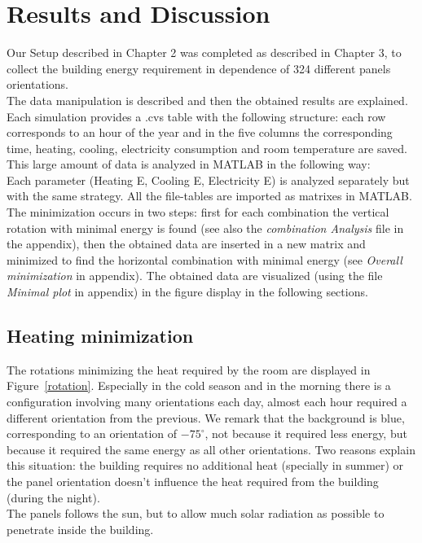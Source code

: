 \chapter{Results and Discussion}

Our Setup described in Chapter 2 was completed as described in Chapter 3, to collect the building energy requirement in dependence of 324 different panels orientations.\\
The data manipulation is described and then the obtained results are explained.\\
Each simulation provides a .cvs table with the following structure: each row corresponds to an hour of the year and in the five columns the corresponding time, heating, cooling, electricity consumption and room temperature are saved.
This large amount of data is analyzed in MATLAB in the following way:\\
Each parameter (Heating E, Cooling E, Electricity E) is analyzed separately but with the same strategy. All the file-tables are imported as matrixes in MATLAB. The minimization occurs in two steps: first for each combination the vertical rotation with minimal energy is found (see also the \textit{combination Analysis} file in the appendix), then the obtained data are inserted in a new matrix and minimized to find the horizontal combination with minimal energy (see \textit{Overall minimization} in appendix).
The obtained data are visualized (using the file \textit{Minimal plot} in appendix) in the figure display in the following sections.

\newpage

\section{Heating minimization}

The rotations minimizing the heat required by the room are displayed in Figure~\ref{rotation}. Especially in the cold season and in the morning there is a configuration involving many orientations each day, almost each hour required a different orientation from the previous. We remark that the background is blue, corresponding to an orientation of $-75 ^\circ$, not because it required less energy, but because it required the same energy as all other orientations. Two reasons explain this situation: the building requires no additional heat (specially in summer) or the panel orientation doesn't influence the heat required from the building (during the night).\\
The panels follows the sun, but to allow much solar radiation as possible to penetrate inside the building.

